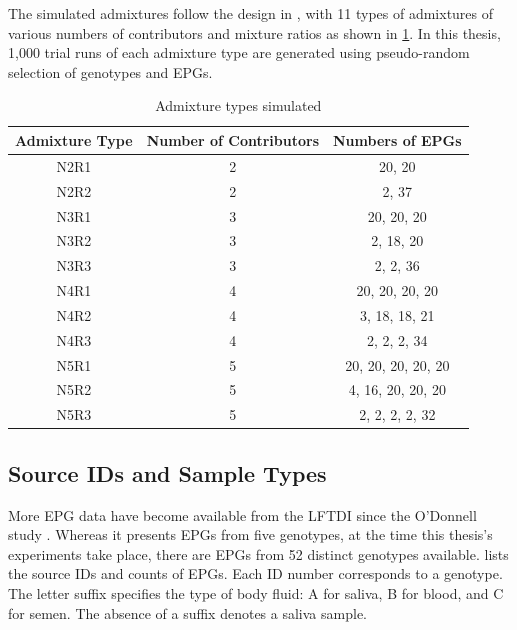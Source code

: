 The simulated admixtures follow the design in \cite{odonnell_clustering_2021}, with 11 types of admixtures of various numbers of contributors and mixture ratios as shown in \cref{table:Admixture types simulated}. In this thesis, 1,000 trial runs of each admixture type are generated using pseudo-random selection of genotypes and EPGs.

\begin{table}[htbp]
\centering
\begin{tabular}{ccc}
\toprule
Admixture Type &  Number of Contributors &    Numbers of EPGs \\
\midrule
          N2R1 &                       2 &             20, 20 \\
          N2R2 &                       2 &              2, 37 \\
          N3R1 &                       3 &         20, 20, 20 \\
          N3R2 &                       3 &          2, 18, 20 \\
          N3R3 &                       3 &           2, 2, 36 \\
          N4R1 &                       4 &     20, 20, 20, 20 \\
          N4R2 &                       4 &      3, 18, 18, 21 \\
          N4R3 &                       4 &        2, 2, 2, 34 \\
          N5R1 &                       5 & 20, 20, 20, 20, 20 \\
          N5R2 &                       5 &  4, 16, 20, 20, 20 \\
          N5R3 &                       5 &     2, 2, 2, 2, 32 \\
\bottomrule
\end{tabular}
\caption{Admixture types simulated}
\label{table:Admixture types simulated}
\end{table}

\subsection{Source IDs and Sample Types}
\label{subsection:Source IDs and Sample Types}

More EPG data have become available from the LFTDI since the O'Donnell study \cite{odonnell_clustering_2021}. Whereas it presents EPGs from five genotypes, at the time this thesis's experiments take place, there are EPGs from 52 distinct genotypes available.  lists the source IDs and counts of EPGs. Each ID number corresponds to a genotype. The letter suffix specifies the type of body fluid: A for saliva, B for blood, and C for semen. The absence of a suffix denotes a saliva sample.


